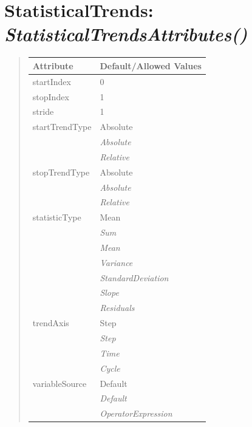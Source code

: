 \documentclass[letterpaper,10pt,english]{sphinxmanual}
\begin{document}
\section{\textbf{StatisticalTrends}: \emph{StatisticalTrendsAttributes()}}
\label{attributes:statisticaltrends-statisticaltrendsattributes}
\begin{DUlineblock}{0em}
\item[] 
\end{DUlineblock}
\begin{quote}

\begin{tabulary}{\linewidth}{|L|L|}
\hline

\textbf{Attribute}
 & 
\textbf{Default/Allowed Values}
\\
\hline
startIndex
 & 
0
\\
\hline
stopIndex
 & 
1
\\
\hline
stride
 & 
1
\\
\hline
startTrendType
 & 
Absolute
\\
\hline & 
\emph{Absolute}
\\
\hline & 
\emph{Relative}
\\
\hline
stopTrendType
 & 
Absolute
\\
\hline & 
\emph{Absolute}
\\
\hline & 
\emph{Relative}
\\
\hline
statisticType
 & 
Mean
\\
\hline & 
\emph{Sum}
\\
\hline & 
\emph{Mean}
\\
\hline & 
\emph{Variance}
\\
\hline & 
\emph{StandardDeviation}
\\
\hline & 
\emph{Slope}
\\
\hline & 
\emph{Residuals}
\\
\hline
trendAxis
 & 
Step
\\
\hline & 
\emph{Step}
\\
\hline & 
\emph{Time}
\\
\hline & 
\emph{Cycle}
\\
\hline
variableSource
 & 
Default
\\
\hline & 
\emph{Default}
\\
\hline & 
\emph{OperatorExpression}
\\
\hline\end{tabulary}

\end{quote}

\begin{DUlineblock}{0em}
\item[] 
\end{DUlineblock}
\end{document}
